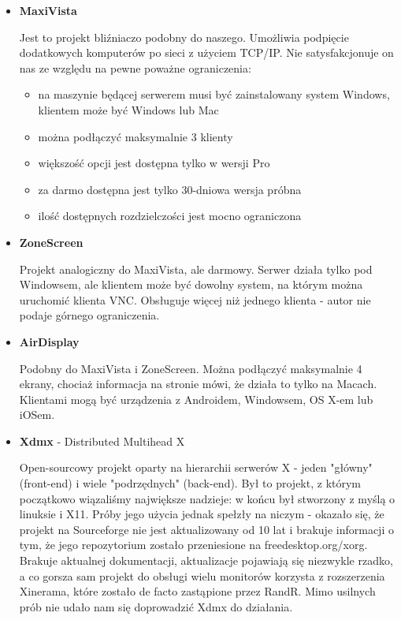     \begin{itemize}

      \item \textbf{MaxiVista} \cite{ProjMaxiVista}

        Jest to projekt bliźniaczo podobny do naszego. Umożliwia podpięcie dodatkowych komputerów po sieci z użyciem TCP/IP. Nie satysfakcjonuje on nas ze względu na pewne poważne ograniczenia:
        \begin{itemize}
          \item na maszynie będącej serwerem musi być zainstalowany system Windows, klientem może być Windows lub Mac
          \item można podłączyć maksymalnie 3 klienty
          \item większość opcji jest dostępna tylko w wersji Pro
          \item za darmo dostępna jest tylko 30-dniowa wersja próbna
          \item ilość dostępnych rozdzielczości jest mocno ograniczona
        \end{itemize}

      \item \textbf{ZoneScreen} \cite{ProjZoneScreen}

        Projekt analogiczny do MaxiVista, ale darmowy. Serwer działa tylko pod Windowsem, ale klientem może być dowolny system, na którym można uruchomić klienta VNC. Obsługuje więcej niż jednego klienta - autor nie podaje górnego ograniczenia.

      \item \textbf{AirDisplay} \cite{ProjAirDisplay}

        Podobny do MaxiVista i ZoneScreen. Można podłączyć maksymalnie 4 ekrany, chociaż informacja na stronie mówi, że działa to tylko na Macach. Klientami mogą być urządzenia z Androidem, Windowsem, OS X-em lub iOSem.

      \item \textbf{Xdmx} - Distributed Multihead X \cite{ProjXDMX}

        Open-sourcowy projekt oparty na hierarchii serwerów X - jeden "główny" (front-end) i wiele "podrzędnych" (back-end). Był to projekt, z którym początkowo wiązaliśmy największe nadzieje: w końcu był stworzony z myślą o linuksie i X11. Próby jego użycia jednak spełzły na niczym - okazało się, że projekt na Sourceforge nie jest aktualizowany od 10 lat i brakuje informacji o tym, że jego repozytorium zostało przeniesione na freedesktop.org/xorg. Brakuje aktualnej dokumentacji, aktualizacje pojawiają się niezwykle rzadko, a co gorsza sam projekt do obsługi wielu monitorów korzysta z rozszerzenia Xinerama, które zostało de facto zastąpione przez RandR. Mimo usilnych prób nie udało nam się doprowadzić Xdmx do działania.


\end{itemize}
